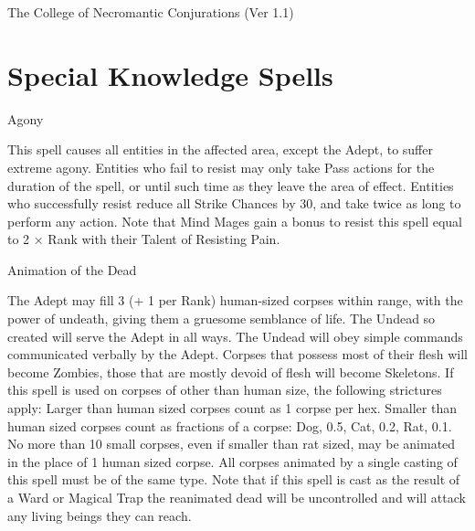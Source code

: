 \begin{Chapter}{The College of Necromantic Conjurations (Ver 1.1)}
\section{Special Knowledge Spells}

\begin{spell}[S-1]{Agony}

\begin{effects}
This spell causes all entities in the affected area, except the Adept,
to suffer extreme agony.  Entities who fail to resist may only take
Pass actions for the duration of the spell, or until such time as they
leave the area of effect.  Entities who successfully resist reduce all
Strike Chances by 30, and take twice as long to perform any action.
Note that Mind Mages gain a bonus to resist this spell equal to 2 ×
Rank with their Talent of Resisting Pain.
\end{effects}
\end{spell}

\begin{spell}[S-2]{Animation of the Dead}

\begin{effects}
The Adept may fill 3 (+ 1 per Rank) human-sized corpses within range,
with the power of undeath, giving them a gruesome semblance of
life. The Undead so created will serve the Adept in all ways. The
Undead will obey simple commands communicated verbally by the
Adept. Corpses that possess most of their flesh will become Zombies,
those that are mostly devoid of flesh will become Skeletons.  If this
spell is used on corpses of other than human size, the following
strictures apply: Larger than human sized corpses count as 1 corpse
per hex. Smaller than human sized corpses count as fractions of a
corpse: Dog, 0.5, Cat, 0.2, Rat, 0.1.  No more than 10 small corpses,
even if smaller than rat sized, may be animated in the place of 1
human sized corpse.  All corpses animated by a single casting of this
spell must be of the same type. Note that if this spell is cast as the
result of a Ward or Magical Trap the reanimated dead will be
uncontrolled and will attack any living beings they can reach.
\end{effects}
\end{spell}


\end{Chapter}
